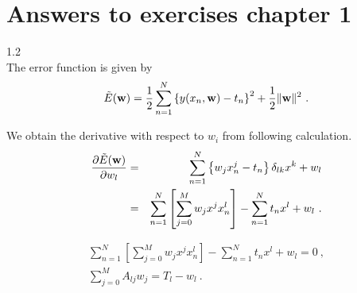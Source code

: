 \section{Answers to exercises chapter 1}
1.2 \\
The error function is given by
\begin{eqnarray}
 \tilde{E}({\bf w}) = \frac{1}{2} \sum_{n=1}^N
  \left \{
   y(x_n, {\bf w}) - t_n
  \right \}^2 + \frac{1}{2} \| {\bf w} \|^2 \ .
\end{eqnarray}

We obtain the derivative with respect to $w_i$ from following calculation.
\begin{eqnarray}
 \frac{\partial \tilde{E}(\bf{w})}{\partial w_l}
 &=&
  \sum_{n=1}^{N}
  \left \{
   w_j x_n^j - t_n
   \right \} \delta_{lk} x^k + w_l \\
 &=&
 \sum_{n=1}^N
  \left [
   \sum_{j=0}^M w_j x^j x_n^l
          \right ]
          - \sum_{n=1}^N t_n x^l + w_l \ .
\end{eqnarray}

\begin{eqnarray}
 \sum_{n=1}^N
  \left [
   \sum_{j=0}^M w_j x^j x_n^l
\right ]
- \sum_{n=1}^N t_n x^l
+ w_l = 0 \ , \\
\sum_{j=0}^M A_{lj} w_j = T_l - w_l \ .
\end{eqnarray}
